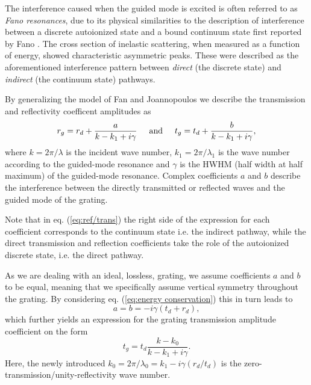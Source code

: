 The interference caused when the guided mode is excited is often referred to as \emph{Fano resonances}, due to its physical similarities to the description of interference between a discrete autoionized state and a bound continuum state first reported by Fano \cite{Fano-theory}. The cross section of inelastic scattering, when measured as a function of energy, showed characteristic asymmetric peaks. These were described as the aforementioned interference pattern between \emph{direct} (the discrete state) and \emph{indirect} (the continuum state) pathways. 

By generalizing the model of Fan and Joannopoulos \cite{Fan-Joannopoulos-guided-mode-resonance} we describe the transmission and reflectivity coefficent amplitudes as 
\begin{equation}
    r_g = r_d + \frac{a}{k-k_1 + i\gamma} \hspace{0.5cm} \text{and} \hspace{0.5cm} t_g = t_d + \frac{b}{k-k_1+i\gamma},
    \label{eq:ref/trans}
\end{equation}
where $k=2\pi/\lambda$ is the incident wave number, $k_1 = 2\pi/\lambda_1$ is the wave number according to the guided-mode resonance and $\gamma$ is the HWHM (half width at half maximum) of the guided-mode resonance. Complex coefficients $a$ and $b$ describe the interference between the directly transmitted or reflected waves and the guided mode of the grating. 

Note that in eq. (\ref{eq:ref/trans}) the right side of the expression for each coefficient corresponds to the continuum state i.e. the indirect pathway, while the direct transmission and reflection coefficients take the role of the autoionized discrete state, i.e. the direct pathway\cite{Fano-theory}.

As we are dealing with an ideal, lossless, grating, we assume coefficients $a$ and $b$ to be equal, meaning that we specifically assume vertical symmetry throughout the grating. By considering eq. (\ref{eq:energy conservation}) this in turn leads to 
\begin{equation}
    a = b = -i \gamma (t_d + r_d),
\end{equation}
which further yields an expression for the grating transmission amplitude coefficient on the form
\begin{equation}
    t_g = t_d \frac{k - k_0}{k - k_1 + i \gamma}.
    \label{eq:lossless transmission coefficient}
\end{equation}
Here, the newly introduced $k_0 = 2\pi/\lambda_0 = k_1 -i \gamma (r_d/t_d)$ is the zero-transmission/unity-reflectivity wave number.

